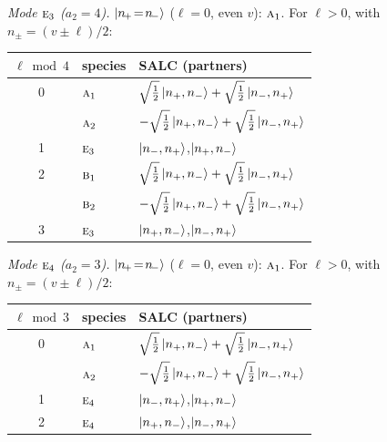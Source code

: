 \documentclass[11pt]{article}
\newcommand{\irr}[1]{\text{\normalfont\scshape #1}}
\begin{document}
\emph{Mode $\irr{e}_{3}$ ($a_2=4$).} $\ket{n_{\!+}\!=\!n_{\!-}}$ ($\ell=0$, even $v$): $\irr{a}_{1}$. For $\ell>0$, with $n_\pm=(v\pm\ell)/2$:
\begin{longtable}{c l l}\hline $\ell\bmod 4$ & species & SALC (partners)\\ \hline\endhead
0 & $\irr{a}_{1}$ & $\sqrt{\tfrac{1}{2}}\ket{n_+,n_-}+\sqrt{\tfrac{1}{2}}\ket{n_-,n_+}$\\
 & $\irr{a}_{2}$ & $-\sqrt{\tfrac{1}{2}}\ket{n_+,n_-}+\sqrt{\tfrac{1}{2}}\ket{n_-,n_+}$\\
1 & $\irr{e}_{3}$ & $\ket{n_-,n_+}$,\quad $\ket{n_+,n_-}$\\
2 & $\irr{b}_{1}$ & $\sqrt{\tfrac{1}{2}}\ket{n_+,n_-}+\sqrt{\tfrac{1}{2}}\ket{n_-,n_+}$\\
 & $\irr{b}_{2}$ & $-\sqrt{\tfrac{1}{2}}\ket{n_+,n_-}+\sqrt{\tfrac{1}{2}}\ket{n_-,n_+}$\\
3 & $\irr{e}_{3}$ & $\ket{n_+,n_-}$,\quad $\ket{n_-,n_+}$\\
\hline\end{longtable}

\emph{Mode $\irr{e}_{4}$ ($a_2=3$).} $\ket{n_{\!+}\!=\!n_{\!-}}$ ($\ell=0$, even $v$): $\irr{a}_{1}$. For $\ell>0$, with $n_\pm=(v\pm\ell)/2$:
\begin{longtable}{c l l}\hline $\ell\bmod 3$ & species & SALC (partners)\\ \hline\endhead
0 & $\irr{a}_{1}$ & $\sqrt{\tfrac{1}{2}}\ket{n_+,n_-}+\sqrt{\tfrac{1}{2}}\ket{n_-,n_+}$\\
 & $\irr{a}_{2}$ & $-\sqrt{\tfrac{1}{2}}\ket{n_+,n_-}+\sqrt{\tfrac{1}{2}}\ket{n_-,n_+}$\\
1 & $\irr{e}_{4}$ & $\ket{n_-,n_+}$,\quad $\ket{n_+,n_-}$\\
2 & $\irr{e}_{4}$ & $\ket{n_+,n_-}$,\quad $\ket{n_-,n_+}$\\
\hline\end{longtable}
\end{document}
